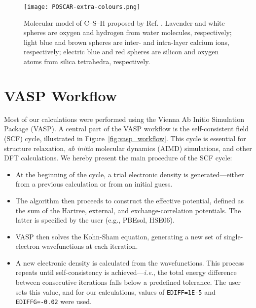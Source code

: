 \begin{figure}[h]
    \centering
    \texttt{[image: POSCAR-extra-colours.png]}
    \caption{Molecular model of  C--S--H proposed by Ref. \cite{Pellenq2009}. Lavender and white spheres are oxygen and hydrogen from water molecules, respectively; light blue and brown spheres are inter- and intra-layer calcium ions, respectively; electric blue and red spheres are silicon and oxygen atoms from silica tetrahedra, respectively.}
    \label{fig:csh_structure}
\end{figure}

\section{VASP Workflow}
\label{sec:vasp-workflow}
Most of our calculations were performed using the Vienna Ab Initio Simulation Package (VASP). A central part of the VASP workflow is the self-consistent field (SCF) cycle, illustrated in Figure~\ref{fig:vasp_workflow}. This cycle is essential for structure relaxation, \emph{ab initio} molecular dynamics (AIMD) simulations, and other DFT calculations. We hereby present the main procedure of the SCF cycle:

\begin{itemize}
    \item At the beginning of the cycle, a trial electronic density is generated---either from a previous calculation or from an initial guess. 
    \item The algorithm then proceeds to construct the effective potential, defined as the sum of the Hartree, external, and exchange-correlation potentials. The latter is specified by the user (e.g., PBEsol, HSE06).
    \item VASP then solves the Kohn-Sham equation, generating a new set of single-electron wavefunctions at each iteration. 
    \item A new electronic density is calculated from the wavefunctions. This process repeats until self-consistency is achieved---\emph{i.e.}, the total energy difference between consecutive iterations falls below a predefined tolerance. The user sets this value, and for our calculations, values of \texttt{EDIFF=1E-5} and \texttt{EDIFFG=-0.02} were used. 
\end{itemize}


